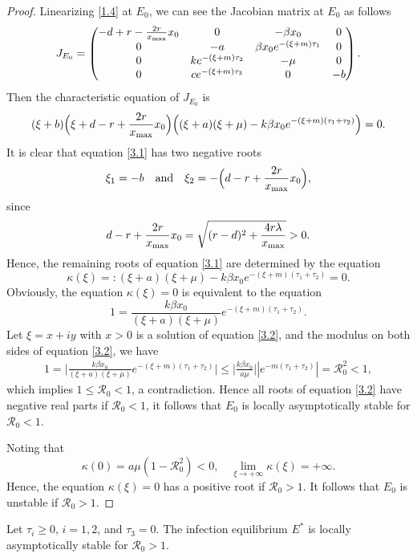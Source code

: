 \documentclass[reqno]{amsart}
\begin{document}
\begin{proof}
Linearizing \eqref{1.4} at $E_0$, we can see the Jacobian matrix at $E_0$ as follows
\[
J_{E_0}=\begin{pmatrix}
-d+r-\frac{2r}{x_{\rm max}}x_0&0&-\beta x_0&0\\
0&-a&\beta x_0e^{-(\xi+m)\tau_1}& 0\\
0&ke^{-(\xi+m)\tau_2}&-\mu&0\\ 0&ce^{-(\xi+m)\tau_3}&0&-b
\end{pmatrix}.
\]
Then the characteristic equation of $J_{E_0}$ is
\begin{equation}\label{3.1}
(\xi+b)\Big(\xi+d-r+{\frac{2r}{x_{\rm max}}x_0}\Big)\Big((\xi+a)(\xi+\mu)
-k\beta x_0e^{-(\xi+m)(\tau_1+\tau_2)}\Big)=0.
\end{equation}
It is clear that equation \eqref{3.1} has two negative roots
\[
\xi_1=-b \quad \text{and}\quad  \xi_2=-\Big(d-r+\frac{2r}{x_{\rm max}}x_0\Big),
\]
since
$$
d-r+{\frac{2r}{x_{\rm max}}x_0}=\sqrt{(r-d)^{2}+\frac{4r\lambda}{x_{\rm max}}}>0.
$$
Hence, the remaining roots of equation \eqref{3.1} are determined by the 
equation
$$
\kappa(\xi)=:(\xi+a)(\xi+\mu)-k\beta x_0e^{-(\xi+m)(\tau_1+\tau_2)}= 0.
$$	
Obviously, the equation $\kappa(\xi)=0$ is equivalent to the equation
\begin{equation}\label{3.2}
1=\frac{k\beta x_0 }{(\xi+a)(\xi+\mu)}e^{-(\xi+m)(\tau_1+\tau_2)}.
\end{equation}	
Let $\xi=x+iy $ with $x>0$ is a solution of equation \eqref{3.2}, and the modulus 
on both sides of equation \eqref{3.2}, we have
\begin{align*}
1=\Big|\frac{k\beta x_0}{(\xi+a)(\xi+\mu)}e^{-(\xi+m)(\tau_1+\tau_2)}\Big|
\leqslant \Big|\frac{k\beta x_0 }{a\mu}\Big||e^{-m(\tau_1+\tau_2)}|= \mathcal{R}_0^{2}<1,
\end{align*}
which implies $1\leq \mathcal{R}_0<1$, a contradiction. 
Hence all roots of equation \eqref{3.2} have
negative real parts if $\mathcal{R}_0<1$, it follows that $E_0$ is locally 
asymptotically stable for $\mathcal{R}_0<1$.
	
Noting that
$$
\kappa(0)=a\mu(1-\mathcal{R}_0^{2})<0, \quad 
\lim_{\xi\to+\infty}\kappa(\xi)=+\infty.
$$
Hence, the equation $\kappa(\xi)=0$ has a positive root if $\mathcal{R}_0>1$. 
It follows that $E_0$ is unstable if $\mathcal{R}_0>1$.	
\end{proof}

\begin{theorem}\label{T3.2}
Let $\tau_{i}\geqslant0$, $i=1,2$, and $\tau_3=0$. The infection equilibrium $E^{*}$ 
is locally asymptotically stable for $\mathcal{R}_0>1$.
\end{theorem}
\end{document}
